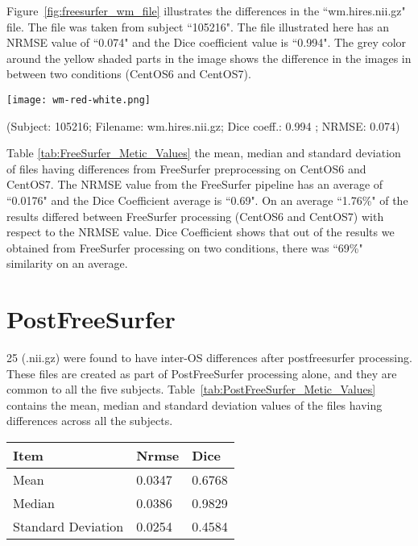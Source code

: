 Figure~\ref{fig:freesurfer_wm_file} illustrates the differences in the ``wm.hires.nii.gz" file. The file was taken from subject ``105216". The file illustrated here has an NRMSE value of ``0.074" and the Dice coefficient value is ``0.994". The grey color around the yellow shaded parts in the image shows the difference in the images in between two conditions (CentOS6 and CentOS7).

\hfill \break
\begin{center}
\texttt{[image: wm-red-white.png]}
\caption*{(Subject: 105216; Filename: wm.hires.nii.gz; Dice coeff.: 0.994 ; NRMSE: 0.074)}
\label{fig:freesurfer_wm_file}
\end{center}

Table \ref{tab:FreeSurfer_Metic_Values} the mean, median and standard deviation of files having differences from FreeSurfer preprocessing on CentOS6 and CentOS7. The NRMSE value from the FreeSurfer pipeline has an average of ``0.0176" and the Dice Coefficient average is ``0.69". On an average ``1.76\%" of the results differed between FreeSurfer processing (CentOS6 and CentOS7) with respect to the NRMSE value. Dice Coefficient shows that out of the results we obtained from FreeSurfer processing on two conditions, there was ``69\%" similarity on an average.

\section{PostFreeSurfer}\label{sec:Postfreesurfer}
25 (.nii.gz) were found to have inter-OS differences after postfreesurfer processing. These files are created as part of PostFreeSurfer processing alone, and they are common to all the five subjects. Table~\ref{tab:PostFreeSurfer_Metic_Values} contains the mean, median and standard deviation values of the files having differences across all the subjects.
\hfill \break
\begin{center}
\begin{tabular}{|l|l|l|}
\hline
\textbf{Item}      & \textbf{Nrmse} & \textbf{Dice} \\ \hline
Mean               & 0.0347     & 0.6768   \\ \hline
Median             & 0.0386    & 0.9829   \\ \hline
Standard Deviation & 0.0254    & 0.4584   \\ \hline
\end{tabular}
\label{tab:PostFreeSurfer_Metic_Values}
\end{center}
\hfill \break

